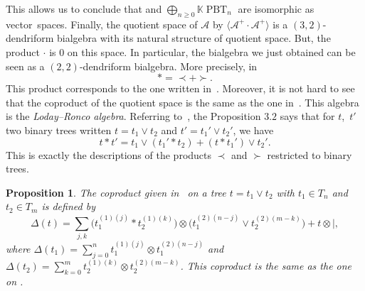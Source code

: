 \documentclass[pdftex]{sigma}
\numberwithin{equation}{section}
\theoremstyle{definition}
\theoremstyle{plain}
\newtheorem{Prop}[defi]{Proposition}
\newcommand{\K}{\mathbb{K}}
\DeclareMathOperator{\PBT}{PBT}
\begin{document}
This allows us to conclude that  and $ \bigoplus_{n\geq 0} \K\PBT_n$ are isomorphic as vector~spaces.
Finally, the quotient space of $\mathcal{A}$ by $\big\langle \mathcal{A}^+\cdot \mathcal{A}^+ \big\rangle$ is a $(3,2)$-dendriform bialgebra with its natural structure of quotient space. But, the product $\cdot$ is $0$ on this space. In particular, the bialgebra we just obtained can be seen as a $(2,2)$-dendriform bialgebra. More precisely, in 
\[
	*=\prec+\succ.
\]
This product corresponds to the one written in~\cite[Proposition 3.2]{LR}. Moreover, it is not hard to see that the coproduct of the quotient space is the same as the one in~\cite[Proposition~3.3]{Eclair}. This algebra is the \emph{Loday--Ronco algebra}.
Referring to~\cite{LR}, the Proposition $3.2$ says that for $t$,~$t'$ two binary trees written $t=t_1\vee t_2$ and $t'=t_1'\vee t_2'$, we have
\[
t*t'=t_1\vee (t_1'*t_2)+(t*t_1')\vee t_2'.
\]
This is exactly the descriptions of the products $\prec$ and $\succ$ restricted to binary trees.
\begin{Prop}
The coproduct given in~{\rm \cite{LR}} on a tree $t=t_1\vee t_2$ with $t_1\in T_n$ and $t_2\in T_m$ is defined by
	\begin{equation*}
		\Delta(t)=\sum_{j,k}\big( t_1^{(1)(j)}* t_2^{(1)(k)} \big)\otimes \big( t_1^{(2)(n-j)}\vee t_2^{(2)(m-k)} \big)+t\otimes |,
	\end{equation*}
	where $ \Delta(t_1)=\sum_{j=0}^n t_1^{(1)(j)}\otimes t_1^{(2)(n-j)}$ and $ \Delta(t_2)=\sum_{k=0}^m t_2^{(1)(k)}\otimes t_2^{(2)(m-k)}$.
	This coproduct is the same as the one on .
\end{Prop}
\end{document}
